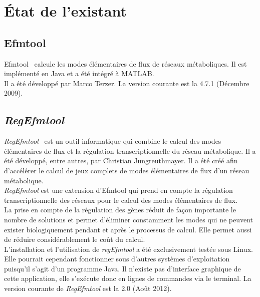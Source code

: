 \chapter{État de l'existant}

\section{Efmtool}
Efmtool~\cite{efmtool:url} calcule les modes élémentaires de flux de réseaux métaboliques. Il est implémenté en Java et a été intégré à MATLAB.\\
Il a été développé par Marco Terzer. La version courante est la 4.7.1 (Décembre 2009).

\section{\emph{RegEfmtool}}
\emph{RegEfmtool}~\cite{regefmtool2:url} est un outil informatique qui combine le calcul des modes élémentaires de flux et la régulation transcriptionnelle du réseau métabolique. Il a été développé, entre autres, par Christian Jungreuthmayer. Il a été créé afin d'accélérer le calcul de jeux complets de modes élémentaires de flux d'un réseau métabolique.\\
\emph{RegEfmtool} est une extension d'Efmtool qui prend en compte la régulation transcriptionnelle des réseaux pour le calcul des modes élémentaires de flux.\\
La prise en compte de la régulation des gènes réduit de façon importante le nombre de solutions et permet d'éliminer constamment les modes qui ne peuvent exister biologiquement pendant et après le processus de calcul. Elle permet aussi de réduire considérablement le coût du calcul.\\
L'installation et l'utilisation de \emph{regEfmtool} a été exclusivement testée sous Linux. Elle pourrait cependant fonctionner sous d'autres systèmes d'exploitation puisqu'il s'agit d'un programme Java. Il n'existe pas d'interface graphique de cette application, elle s'exécute donc en lignes de commandes via le terminal.
La version courante de \emph{RegEfmtool} est la 2.0 (Août 2012).

